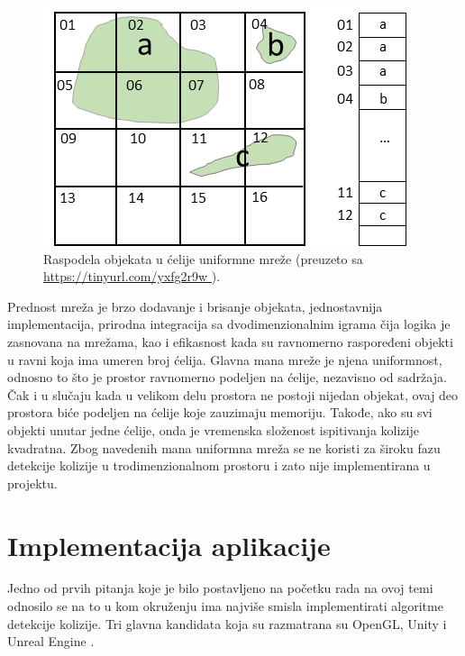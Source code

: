 \documentclass[12pt,oneside]{memoir}
\begin{document}
\begin{figure}[h!]
	\centering
	\includegraphics[scale=1.2]{grid.png}
	\caption{Raspodela objekata u ćelije uniformne mreže (preuzeto sa \url{ https://tinyurl.com/yxfg2r9w }).}
	\label{fig:grid}
\end{figure}

Prednost mreža je brzo dodavanje i brisanje objekata, jednostavnija implementacija,
prirodna integracija sa dvodimenzionalnim igrama čija logika je zasnovana na mrežama,
kao i efikasnost kada su ravnomerno raspoređeni objekti u ravni koja ima umeren broj ćelija.
Glavna mana mreže je njena uniformnost, odnosno to što je prostor ravnomerno podeljen na ćelije, nezavisno od sadržaja.
Čak i u slučaju kada u velikom delu prostora ne postoji nijedan objekat, ovaj deo prostora biće podeljen na ćelije koje zauzimaju memoriju.
Takođe, ako su svi objekti unutar jedne ćelije, onda je vremenska složenost ispitivanja kolizije kvadratna.
Zbog navedenih mana uniformna mreža se ne koristi za široku fazu detekcije kolizije u trodimenzionalnom prostoru 
i zato nije implementirana u projektu.

\chapter{Implementacija aplikacije}
\label{sec:implementacija}

Jedno od prvih pitanja koje je bilo postavljeno na početku rada na ovoj temi odnosilo se na to 
u kom okruženju ima najviše smisla implementirati algoritme detekcije kolizije.
Tri glavna kandidata koja su razmatrana su OpenGL, Unity i Unreal Engine \cite{unreal}.
\end{document}

